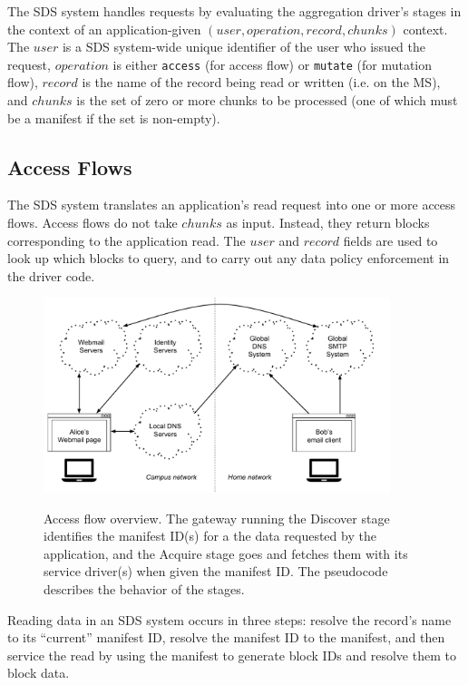 The SDS system handles requests by evaluating the aggregation driver's stages in the context of
an application-given $(user, operation, record, chunks)$ context.  The
$user$ is a SDS system-wide unique identifier of the user who issued the request,
$operation$ is either \texttt{access} (for access flow) or \texttt{mutate} (for
mutation flow), $record$ is the name of the record being read or written (i.e. on
the MS), and $chunks$ is the set of zero or more chunks to be processed (one of which must be
a manifest if the set is non-empty).

\subsection{Access Flows}

The SDS system translates an application's read request into one or more access
flows.  Access flows do not take $chunks$ as input.  Instead, they return blocks
corresponding to the application read.  The $user$ and $record$ fields are used
to look up which blocks to query, and to carry out any data policy enforcement
in the driver code.

\begin{figure}[h]
   \caption{Access flow overview.  The gateway running the Discover stage
   identifies the manifest ID(s) for a the data requested by the application,
   and the Acquire stage goes and fetches them with its service driver(s)
   when given the manifest ID.  The pseudocode describes the behavior of the
   stages.}
   \centering
   \includegraphics[width=0.9\textwidth,page=7]{figures/dissertation-figures}
   \label{fig:chap2-access-flow}
\end{figure}

Reading data in an SDS system occurs in three steps:  resolve the record's name
to its ``current'' manifest ID, resolve the manifest ID to the manifest, and
then service the read by using the manifest to generate block IDs and resolve
them to block data.

